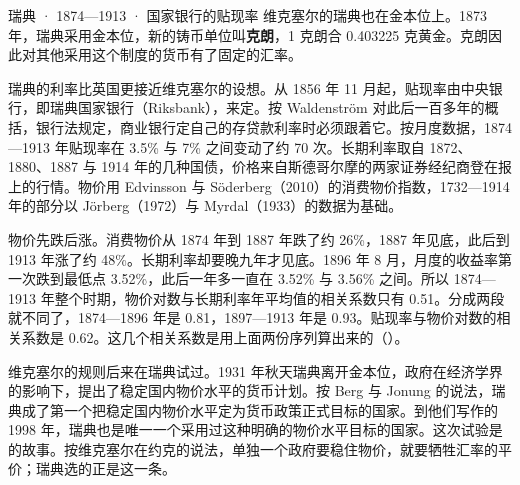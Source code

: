 \begin{case}{瑞典 · 1874—1913 · 国家银行的贴现率}
维克塞尔的瑞典也在金本位上。1873 年，瑞典采用金本位，新的铸币单位叫\textbf{克朗}，1 克朗合 0.403225 克黄金\cite{riksbank2026b}。克朗因此对其他采用这个制度的货币有了固定的汇率\cite{riksbank2026b}。

瑞典的利率比英国更接近维克塞尔的设想。从 1856 年 11 月起，贴现率由中央银行，即瑞典国家银行（Riksbank），来定\cite{waldenstrom2014}。按 Waldenström 对此后一百多年的概括，银行法规定，商业银行定自己的存贷款利率时必须跟着它\cite{waldenstrom2014}。按月度数据，1874—1913 年贴现率在 3.5\% 与 7\% 之间变动了约 70 次\cite{waldenstrom2014}。长期利率取自 1872、1880、1887 与 1914 年的几种国债，价格来自斯德哥尔摩的两家证券经纪商登在报上的行情\cite{waldenstrom2014}。物价用 Edvinsson 与 Söderberg（2010）的消费物价指数，1732—1914 年的部分以 Jörberg（1972）与 Myrdal（1933）的数据为基础\cite{edvinsson2010b}。

物价先跌后涨。消费物价从 1874 年到 1887 年跌了约 26\%，1887 年见底，此后到 1913 年涨了约 48\%\cite{edvinsson2010b}。长期利率却要晚九年才见底。1896 年 8 月，月度的收益率第一次跌到最低点 3.52\%，此后一年多一直在 3.52\% 与 3.56\% 之间\cite{waldenstrom2014}。所以 1874—1913 年整个时期，物价对数与长期利率年平均值的相关系数只有 0.51。分成两段就不同了，1874—1896 年是 0.81，1897—1913 年是 0.93。贴现率与物价对数的相关系数是 0.62。这几个相关系数是用上面两份序列算出来的（）。

维克塞尔的规则后来在瑞典试过。1931 年秋天瑞典离开金本位，政府在经济学界的影响下，提出了稳定国内物价水平的货币计划\cite{berg1998}。按 Berg 与 Jonung 的说法，瑞典成了第一个把稳定国内物价水平定为货币政策正式目标的国家\cite{berg1998}。到他们写作的 1998 年，瑞典也是唯一一个采用过这种明确的物价水平目标的国家\cite{berg1998}。这次试验是的故事。按维克塞尔在约克的说法，单独一个政府要稳住物价，就要牺牲汇率的平价；瑞典选的正是这一条。
\end{case}


